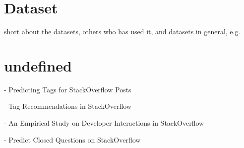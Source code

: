 \begin{comment}
\end{itemize}
Experimental results show that \gls{svm}s consistently achieve good performance on text categorization tasks, outperforming existing methods substantially and significantly. 
With their ability to generalize well in high dimensional feature spaces, \gls{svm}s eliminate the need for feature selection, making the application of text categorization considerably easier.
Another advantage of \gls{svm}s over the conventional methods is their robustness. 
\gls{svm}s show good performance in all experiments, avoiding catastrophic failure, as observed with the conventional methods on some tasks. 
Furthermore, \gls{svm}s do not require any parameter tuning, since they can find good parameter settings automatically. 
All this makes \gls{svm}s a very promising and easy-to-use method for learning text classifiers from examples.
\cite{Joachims1998}
\end{comment}






\section{Dataset}
\label{sec:dataset}
short about the datasets, others who has used it, and datasets in general, e.g. 
\cite{Klein2016,SpaceMachine.net2016,Wissner-Gross2016}









\section{undefined}
\label{sec:undefined}

\textcite{Stanley2013} - Predicting Tags for StackOverflow Posts

\textcite{Short2014} - Tag Recommendations in StackOverflow

\textcite{Wang2013} - An Empirical Study on Developer Interactions in StackOverflow

\textcite{Lezina2013} - Predict Closed Questions on StackOverflow

